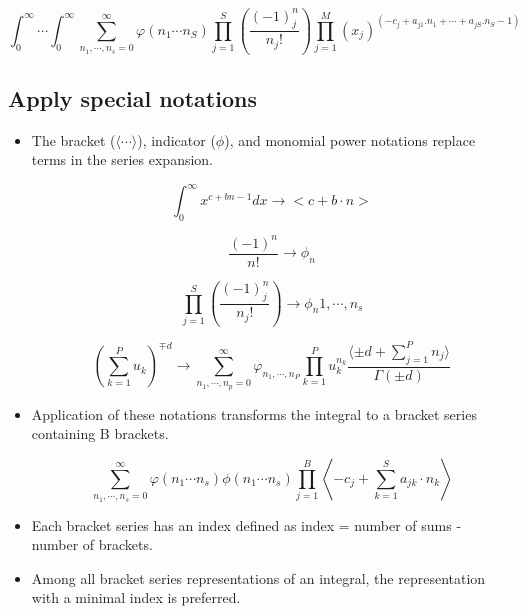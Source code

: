 \documentclass{article}
\begin{document}
\begin{equation}
\label{eq1}
\int_0^\infty \cdots \int_0^\infty \sum_{n_1,\cdots , n_s = 0}^\infty \varphi(n_1 \cdots n_S) \prod_{j=1}^S \left(\frac{(-1)^n_j}{n_j !}\right) \prod_{j=1}^M (x_j)^{(-c_j+a_{j1} . n_1+\cdots+a_{jS}.n_S-1)} 
\end{equation}


\subsection{Apply special notations}
\begin{itemize}
    \item The bracket ($\langle \cdots \rangle$), indicator ($\phi$), and monomial power notations replace terms in the series expansion.\cite{citation2}

    \begin{equation}
    \label{eq2}
        \int_0^\infty x^{c+bn-1} dx \rightarrow <c+b \cdot n>
    \end{equation}

    \begin{equation}
    \label{eq3}
       \frac{(-1)^n}{n!} \rightarrow \phi_n
    \end{equation}

    \begin{equation}
    \label{eq4}
        \prod_{j=1}^S \left(\frac{(-1)^n_j}{n_j !}\right)\rightarrow \phi_n1,\cdots,n_s
    \end{equation}

    \begin{equation}
    \label{eq5}
        \left(\sum_{k=1}^P u_k\right)^{\mp d} \rightarrow \sum_{n_1,\cdots,n_p=0}^\infty\varphi_{n_1,\cdots,n_P}\prod_{k=1}^P u_k^{n_k}\frac{\langle\pm d + \sum_{j=1}^P n_j\rangle}{\Gamma(\pm d)}
    \end{equation}
 
    \item  Application of these notations transforms the integral to a bracket series containing B brackets.\cite{adv_applied_maths}

    \begin{equation}
    \label{eq6}
    \sum_{n_1,\cdots,n_s=0}^\infty \varphi(n_1\cdots n_s)\phi(n_1 \cdots n_s)\prod_{j=1}^B\left\langle -c_j + \sum_{k=1}^S a_{jk}\cdot n_k \right\rangle
    \end{equation}
 
    \item Each bracket series has an index defined as index = number of sums - number of brackets.
    
    \item Among all bracket series representations of an integral, the representation with a minimal index is preferred.
    
\end{itemize}
\end{document}
